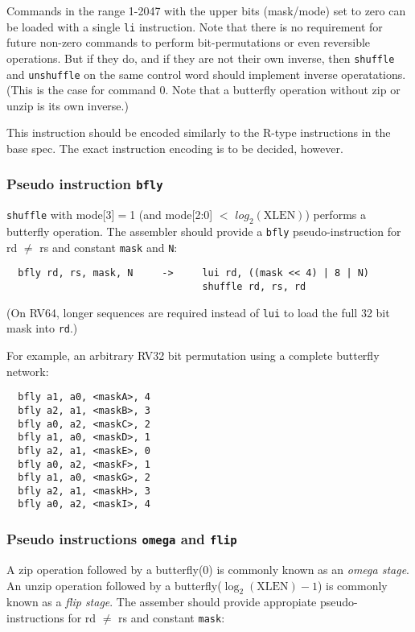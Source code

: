 Commands in the range 1-2047 with the upper bits (mask/mode) set to zero can be
loaded with a single \texttt{li} instruction. Note that there is no
requirement for future non-zero commands to perform bit-permutations or even
reversible operations. But if they do, and if they are not their own inverse,
then {\tt shuffle} and {\tt unshuffle} on the same control word should
implement inverse operatations. (This is the case for command $0$. Note that a
butterfly operation without zip or unzip is its own inverse.)



This instruction should be encoded similarly to the R-type instructions in the
base spec. The exact instruction encoding is to be decided, however.

\subsubsection{Pseudo instruction {\tt bfly}}

{\tt shuffle} with mode[3]$=$1 (and mode[2:0] $<$ $log_2(\textrm{XLEN})$) performs
a butterfly operation. The assembler should provide a {\tt bfly} pseudo-instruction
for rd $\neq$ rs and constant {\tt mask} and {\tt N}:

\begin{verbatim}
  bfly rd, rs, mask, N     ->     lui rd, ((mask << 4) | 8 | N)
                                  shuffle rd, rs, rd
\end{verbatim}

(On RV64, longer sequences are required instead of {\tt lui} to load the full
32 bit mask into {\tt rd}.)

For example, an arbitrary RV32 bit permutation using a complete butterfly network:

\begin{verbatim}
  bfly a1, a0, <maskA>, 4
  bfly a2, a1, <maskB>, 3
  bfly a0, a2, <maskC>, 2
  bfly a1, a0, <maskD>, 1
  bfly a2, a1, <maskE>, 0
  bfly a0, a2, <maskF>, 1
  bfly a1, a0, <maskG>, 2
  bfly a2, a1, <maskH>, 3
  bfly a0, a2, <maskI>, 4
\end{verbatim}

\subsubsection{Pseudo instructions {\tt omega} and {\tt flip}}

A zip operation followed by a butterfly(0) is commonly known as an {\it omega stage}.
An unzip operation followed by a butterfly($\log_2(\textrm{XLEN})-1$) is commonly
known as a {\it flip stage}. The assember should provide appropiate
pseudo-instructions for rd $\neq$ rs and constant {\tt mask}:

